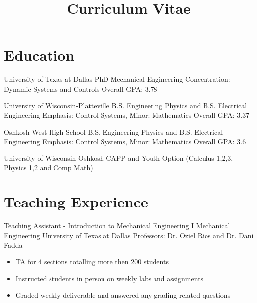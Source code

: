 \documentclass[11pt,letterpaper,roman]{moderncv} %
\title{Curriculum Vitae}
\begin{document}

\makecvtitle %

\vspace{- 0.5 cm}

\section{Education}

{University of Texas at Dallas}
{PhD Mechanical Engineering}{}
{Concentration: Dynamic Systems and Controls} 
{Overall GPA: 3.78}

{University of Wisconsin-Platteville}
{B.S. Engineering Physics and  B.S. Electrical Engineering}{}
{Emphasis: Control Systems, Minor: Mathematics} 
{Overall GPA: 3.37}

{Oshkosh West High School}
{B.S. Engineering Physics and  B.S. Electrical Engineering}{}
{Emphasis: Control Systems, Minor: Mathematics} 
{Overall GPA: 3.6}

{University of Wisconsin-Oshkosh}
{CAPP and Youth Option}
{(Calculus 1,2,3, Physics 1,2 and Comp Math)}{}{}


\section{Teaching Experience}

{Teaching Assistant - Introduction to Mechanical Engineering I}
{Mechanical Engineering}
{University of Texas at Dallas}
{Professors: Dr. Oziel Rios and Dr. Dani Fadda}
{\begin{itemize}
    \item TA for 4 sections totalling more then 200 students
    \item Instructed students in person on weekly labs and assignments
    \item Graded weekly deliverable and answered any grading related questions
\end{itemize}}
\end{document}

